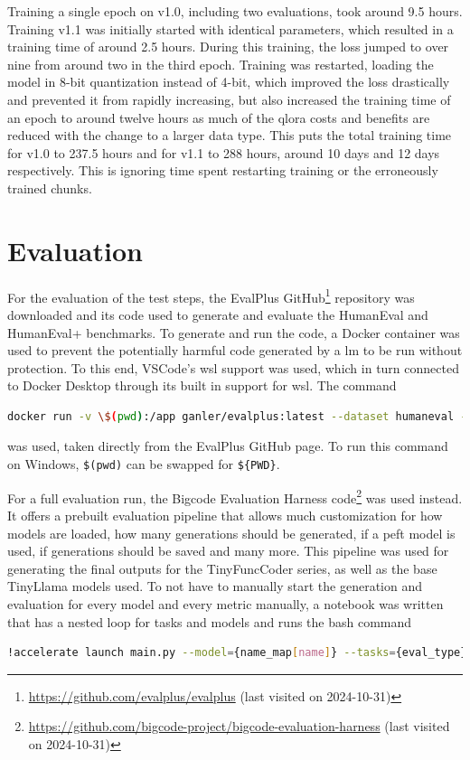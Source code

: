 Training a single epoch on v1.0, including two evaluations, took around 9.5 hours.
Training v1.1 was initially started with identical parameters, which resulted in a training time of around 2.5 hours.
During this training, the loss jumped to over nine from around two in the third epoch.
Training was restarted, loading the model in 8-bit quantization instead of 4-bit, which improved the loss drastically and prevented it from rapidly increasing, but also increased the training time of an epoch to around twelve hours as much of the \ac{qlora} costs and benefits are reduced with the change to a larger data type.
This puts the total training time for v1.0 to 237.5 hours and for v1.1 to 288 hours, around 10 days and 12 days respectively.
This is ignoring time spent restarting training or the erroneously trained chunks.

\section{Evaluation}
\label{sec:eval}

For the evaluation of the test steps, the EvalPlus GitHub\footnote{\url{https://github.com/evalplus/evalplus} (last visited on 2024-10-31)} repository was downloaded and its code used to generate and evaluate the HumanEval and HumanEval+ benchmarks.
To generate and run the code, a Docker container was used to prevent the potentially harmful code generated by a \ac{lm} to be run without protection.
To this end, VSCode's \ac{wsl} support was used, which in turn connected to Docker Desktop through its built in support for \ac{wsl}.
The command
\begin{lstlisting}[language=bash]
    docker run -v \$(pwd):/app ganler/evalplus:latest --dataset humaneval --samples samples.jsonl
\end{lstlisting}
was used, taken directly from the EvalPlus GitHub page.
To run this command on Windows, \texttt{\$(pwd)} can be swapped for \texttt{\$\{PWD\}}.

For a full evaluation run, the Bigcode Evaluation Harness code\footnote{\url{https://github.com/bigcode-project/bigcode-evaluation-harness} (last visited on 2024-10-31)} was used instead.
It offers a prebuilt evaluation pipeline that allows much customization for how models are loaded, how many generations should be generated, if a peft model is used, if generations should be saved and many more.
This pipeline was used for generating the final outputs for the TinyFuncCoder series, as well as the base TinyLlama models used.
To not have to manually start the generation and evaluation for every model and every metric manually, a notebook was written that has a nested loop for tasks and models and runs the bash command
\begin{lstlisting}[language=bash]
    !accelerate launch main.py --model={name_map[name]} --tasks={eval_type} --save_generations --save_generations_path=save/{name}/{reformatted_path} --n_samples=1 --allow_code_execution --trust_remote_code --prompt=continue --temperature=0.2 --generation_only
\end{lstlisting}


